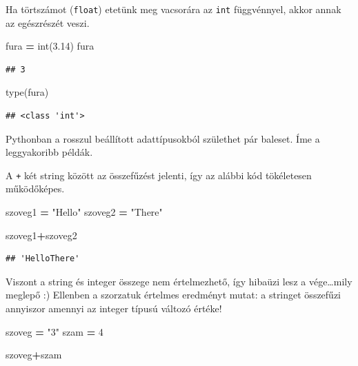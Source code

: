 \documentclass[
]{book}
\newenvironment{Shaded}{\begin{snugshade}}{\end{snugshade}}
\newcommand{\BuiltInTok}[1]{#1}
\newcommand{\DecValTok}[1]{\textcolor[rgb]{0.00,0.00,0.81}{#1}}
\newcommand{\FloatTok}[1]{\textcolor[rgb]{0.00,0.00,0.81}{#1}}
\newcommand{\NormalTok}[1]{#1}
\newcommand{\OperatorTok}[1]{\textcolor[rgb]{0.81,0.36,0.00}{\textbf{#1}}}
\newcommand{\StringTok}[1]{\textcolor[rgb]{0.31,0.60,0.02}{#1}}
\begin{document}
Ha törtszámot (\texttt{float}) etetünk meg vacsorára az \texttt{int} függvénnyel, akkor annak az egészrészét veszi.

\begin{Shaded}
\begin{Highlighting}[]
\NormalTok{fura }\OperatorTok{=} \BuiltInTok{int}\NormalTok{(}\FloatTok{3.14}\NormalTok{)}
\NormalTok{fura}
\end{Highlighting}
\end{Shaded}

\begin{verbatim}
## 3
\end{verbatim}

\begin{Shaded}
\begin{Highlighting}[]
\BuiltInTok{type}\NormalTok{(fura)}
\end{Highlighting}
\end{Shaded}

\begin{verbatim}
## <class 'int'>
\end{verbatim}

Pythonban a rosszul beállított adattípusokból születhet pár baleset. Íme a leggyakoribb példák.

A \texttt{+} két string között az összefűzést jelenti, így az alábbi kód tökéletesen működőképes.

\begin{Shaded}
\begin{Highlighting}[]
\NormalTok{szoveg1 }\OperatorTok{=} \StringTok{"Hello"}
\NormalTok{szoveg2 }\OperatorTok{=} \StringTok{"There"}

\NormalTok{szoveg1}\OperatorTok{+}\NormalTok{szoveg2}
\end{Highlighting}
\end{Shaded}

\begin{verbatim}
## 'HelloThere'
\end{verbatim}

Viszont a string és integer összege nem értelmezhető, így hibaüzi lesz a vége\ldots mily meglepő :)
Ellenben a szorzatuk értelmes eredményt mutat: a stringet összefűzi annyiszor amennyi az integer típusú változó értéke!

\begin{Shaded}
\begin{Highlighting}[]
\NormalTok{szoveg }\OperatorTok{=} \StringTok{"3"}
\NormalTok{szam }\OperatorTok{=} \DecValTok{4}

\NormalTok{szoveg}\OperatorTok{+}\NormalTok{szam}
\end{Highlighting}
\end{Shaded}
\end{document}
